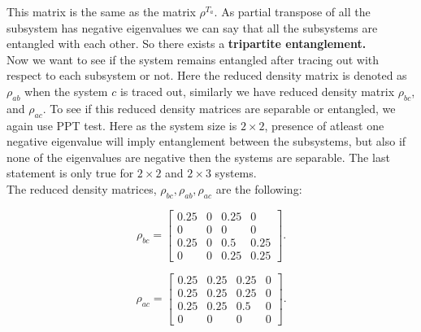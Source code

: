 \documentclass{scrartcl}
\begin{document}
	This matrix is the same as the matrix $\rho^{T_a}$. As partial transpose of all the subsystem has negative eigenvalues we can say that all the subsystems are entangled with each other. So there exists a \textbf{tripartite entanglement.}\\[0.3cm]
	Now we want to see if the system remains entangled after tracing out with respect to each subsystem or not. Here the reduced density matrix is denoted as $\rho_{ab}$ when the system $c$ is traced out, similarly we have reduced density matrix $\rho_{bc}$, and $\rho_{ac}$. To see if this reduced density matrices are separable or entangled, we again use PPT test. Here as the system size is $2 \times 2$, presence of atleast one negative eigenvalue will imply entanglement between the subsystems, but also if none of the eigenvalues are negative then the systems are separable. The last statement is only true for $2 \times 2$ and $2 \times 3$ systems.\\[0.3cm]
	The reduced density matrices, $ \rho_{bc},\rho_{ab}, \rho_{ac}$ are the following:
	
	\begin{equation*}
		\rho_{bc} = \left[\begin{matrix}0.25 & 0 & 0.25 & 0\\0 & 0 & 0 & 0\\0.25 & 0 & 0.5 & 0.25\\0 & 0 & 0.25 & 0.25\end{matrix}\right].
	\end{equation*}

	\begin{equation*}
		\rho_{ac} = \left[\begin{matrix}0.25 & 0.25 & 0.25 & 0\\0.25 & 0.25 & 0.25 & 0\\0.25 & 0.25 & 0.5 & 0\\0 & 0 & 0 & 0\end{matrix}\right].
	\end{equation*}
\end{document}
